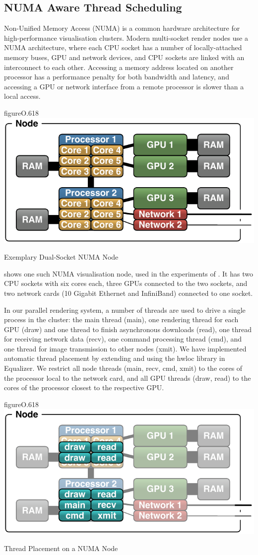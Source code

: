 \subsection{NUMA Aware Thread Scheduling}

Non-Unified Memory Access (NUMA) is a common hardware architecture for
high-performance visualisation clusters. Modern multi-socket render nodes use a
NUMA architecture, where each CPU socket has a number of locally-attached
memory buses, GPU and network devices, and CPU sockets are linked with an
interconnect to each other. Accessing a memory address located on another
processor has a performance penalty for both bandwidth and latency, and
accessing a GPU or network interface from a remote processor is slower than a
local access.

\begin{wrapfloat}{figure}{O}{.618\textwidth}
 \includegraphics[width=.618\textwidth]{images/numaNode.pdf}
 {\caption{\label{fNumaNode}Exemplary Dual-Socket NUMA Node}}
\end{wrapfloat}

 shows one such NUMA visualisation node, used in the experiments
of \cite{EBAHMP:12}. It has two CPU sockets with six cores each, three GPUs
connected to the two sockets, and two network cards (10 Gigabit Ethernet and
InfiniBand) connected to one socket.

In our parallel rendering system, a number of threads are used to drive a
single process in the cluster: the main thread (main), one rendering thread for
each GPU (draw) and one thread to finish asynchronous downloads (read), one
thread for receiving network data (recv), one command processing thread (cmd),
and one thread for image transmission to other nodes (xmit). We have
implemented automatic thread placement by extending and using the hwloc library
in Equalizer. We restrict all node threads (main, recv, cmd, xmit) to the cores
of the processor local to the network card, and all GPU threads (draw, read) to
the cores of the processor closest to the respective GPU.

\begin{wrapfloat}{figure}{O}{.618\textwidth}
 \includegraphics[width=.618\textwidth]{images/numaThreads.pdf}
 {\caption{\label{fNumaThreads}Thread Placement on a NUMA Node}}
\end{wrapfloat}

